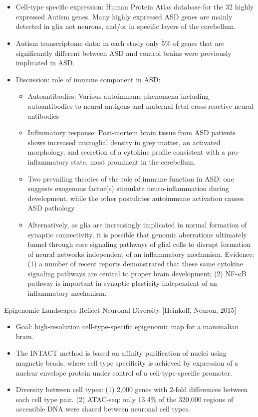 \documentclass{report}
\begin{document}
\begin{itemize}
	\item Cell-type specific expression: Human Protein Atlas database for the 32 highly expressed Autism genes. Many highly expressed ASD genes are mainly detected in glia not neurons, and/or in specific layers of the cerebellum.
	
	\item Autism transcriptome data: in each study only $\tilde 5\%$ of genes that are significantly different between ASD and control brains were previously implicated in ASD. 
	
	\item Discussion: role of immune component in ASD: 
	\begin{itemize}
		\item Autoantibodies: Various autoimmune phenomena including autoantibodies to neural antigens and maternal-fetal cross-reactive neural antibodies
		
		\item Inflmmatory response: Post-mortem brain tissue from ASD patients shows increased microglial density in grey matter, an activated morphology, and secretion of a cytokine profile consistent with a pro-inflammatory state, most prominent in the cerebellum. 
		
		\item Two prevailing theories of the role of immune function in ASD: one suggests exogenous factor(s) stimulate neuro-inflammation during development, while the other postulates autoimmune activation causes ASD pathology 
		
		\item Alternatively, as glia are increasingly implicated in normal formation of synaptic connectivity, it is possible that genomic aberrations ultimately funnel through core signaling pathways of glial cells to disrupt formation of neural networks independent of an inflammatory mechanism. Evidence: (1) a number of recent reports demonstrated that these same cytokine signaling pathways are central to proper brain development; (2) NF-$\kappa$B pathway is important in synaptic plasticity independent of an inflammatory mechanism. 
	\end{itemize}
	
\end{itemize}

Epigenomic Landscapes Reflect Neuronal Diversity [Heinkoff, Neuron, 2015]
\begin{itemize}
	\item Goal: high-resolution cell-type-specific epigenomic map for a mammalian brain. 
	
	\item The INTACT method is based on affinity purification of nuclei using magnetic beads, where cell type specificity is achieved by expression of a nuclear envelope protein under control of a cell-type-specific promoter. 
	
	\item Diversity between cell types: (1) 2,000 genes with 2-fold differences between each cell type pair. (2) ATAC-seq: only 13.4\% of the 320,000 regions of accessible DNA were shared between neuronal cell types. 
\end{itemize}
\end{document}

